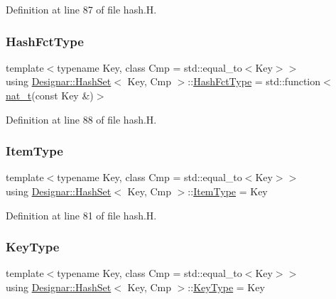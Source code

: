 Definition at line 87 of file hash.\+H.

\mbox{\label{class_designar_1_1_hash_set_a05d8d111665c25bc17290c01fa299398}} 
\subsubsection{\texorpdfstring{Hash\+Fct\+Type}{HashFctType}}
{\footnotesize\ttfamily template$<$typename Key, class Cmp = std\+::equal\+\_\+to$<$\+Key$>$$>$ \\
using \hyperlink{class_designar_1_1_hash_set}{Designar\+::\+Hash\+Set}$<$ Key, Cmp $>$\+::\hyperlink{class_designar_1_1_hash_set_a05d8d111665c25bc17290c01fa299398}{Hash\+Fct\+Type} =  std\+::function$<$\hyperlink{namespace_designar_aa72662848b9f4815e7bf31a7cf3e33d1}{nat\+\_\+t}(const Key \&)$>$}



Definition at line 88 of file hash.\+H.

\mbox{\label{class_designar_1_1_hash_set_af1cb023a84bf6c6f17867f99bbc523c5}} 
\subsubsection{\texorpdfstring{Item\+Type}{ItemType}}
{\footnotesize\ttfamily template$<$typename Key, class Cmp = std\+::equal\+\_\+to$<$\+Key$>$$>$ \\
using \hyperlink{class_designar_1_1_hash_set}{Designar\+::\+Hash\+Set}$<$ Key, Cmp $>$\+::\hyperlink{class_designar_1_1_hash_set_af1cb023a84bf6c6f17867f99bbc523c5}{Item\+Type} =  Key}



Definition at line 81 of file hash.\+H.

\mbox{\label{class_designar_1_1_hash_set_a4e23320d0b13915ce84186132ad4197a}} 
\subsubsection{\texorpdfstring{Key\+Type}{KeyType}}
{\footnotesize\ttfamily template$<$typename Key, class Cmp = std\+::equal\+\_\+to$<$\+Key$>$$>$ \\
using \hyperlink{class_designar_1_1_hash_set}{Designar\+::\+Hash\+Set}$<$ Key, Cmp $>$\+::\hyperlink{class_designar_1_1_hash_set_a4e23320d0b13915ce84186132ad4197a}{Key\+Type} =  Key}




